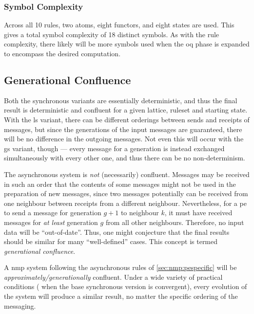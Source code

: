 \subsubsection{Symbol Complexity}
Across all 10 rules, two atoms, eight \glspl{functor}, and eight states are used.  This gives a total symbol complexity of 18 distinct symbols.  As with the rule complexity, there likely will be more symbols used when the \gls{oq} phase is expanded to encompass the desired computation.

\subsection{Generational Confluence}
Both the synchronous variants are essentially deterministic, and thus the final result is deterministic and confluent for a given lattice, ruleset and starting state.  With the \gls{ls} variant, there can be different orderings between sends and receipts of messages, but since the generations of the input messages are guaranteed, there will be no difference in the outgoing messages.  Not even this will occur with the \gls{gs} variant, though --- every message for a generation is instead exchanged simultaneously with every other one, and thus there can be no non-determinism.

The asynchronous system is \emph{not} (necessarily) confluent.  Messages may be received in such an order that the contents of some messages might not be used in the preparation of new messages, since two messages potentially can be received from one neighbour between receipts from a different neighbour.  Nevertheless, for a \gls{pe} to send a message for generation \(g + 1\) to neighbour \(k\), it must have received messages for \emph{at least} generation \(g\) from all other neighbours.  Therefore, no input data will be ``out-of-date''.  Thus, one might conjecture that the final results should be similar for many “well-defined” cases.  This concept is termed \emph{generational confluence}.

\begin{conjecture}\label{conj:nmp:1}
A \gls{nmp} system following the asynchronous rules of \cref{sec:nmp:pespecific} will be \emph{approximately/generationally} confluent.  Under a wide variety of practical conditions (\eg{} when the base synchronous version is convergent), every evolution of the system will produce a similar result, no matter the specific ordering of the messaging.
\end{conjecture}

